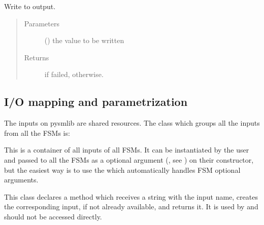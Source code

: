 \documentclass[letterpaper,10pt,english]{sphinxmanual}
\begin{document}
\begin{fulllineitems}
\label{\detokenize{io:put}}
Write  to output.
\begin{quote}\begin{description}
\item[{Parameters}] \leavevmode
{} () \textendash{} the value to be written

\item[{Returns}] \leavevmode
{} if {\hyperref[\detokenize{io:put}]{}} failed,  otherwise.

\end{description}\end{quote}

\end{fulllineitems}



\subsection{I/O mapping and parametrization}
\label{\detokenize{io:i-o-mapping-and-parametrization}}\label{\detokenize{io:io-mapping}}
The inputs on pysmlib are shared resources. The class which groups all the
inputs from all the FSMs is:

\begin{fulllineitems}
\label{\detokenize{io:fsmIOs}}
This is a container of all inputs of all FSMs. It can be instantiated by the
user and passed to all the FSMs as a optional argument (, see
{\hyperref[\detokenize{fsm:fsmBase}]{}}) on their constructor, but the easiest way is to use
the {\hyperref[\detokenize{loader:loader}]{}} which automatically handles FSM optional arguments.

This class declares a method  which receives a string with the
input name, creates the corresponding input, if not already available,
and returns it. It is used by {\hyperref[\detokenize{fsm:connect}]{}} and should not be accessed
directly.

\end{fulllineitems}
\end{document}
